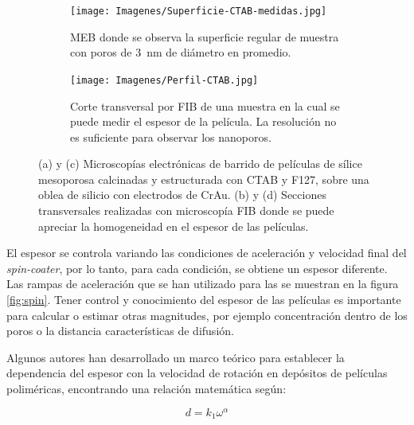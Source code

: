 \begin{figure}[bh!]
\begin{subfigure}[t]{0.495\textwidth}
			       		\label{fig:sem_homogeneidad2}
			       		\end{subfigure}	
			       	\begin{subfigure}[t]{0.495\textwidth}
			        	\texttt{[image: Imagenes/Superficie-CTAB-medidas.jpg]}
			       		\caption{MEB donde se observa la superficie regular de muestra \pdmC\space con poros de \SI{3}{nm} de diámetro en promedio.}
			       		\label{fig:sem_homogeneidad3}
			       		\end{subfigure}
					\begin{subfigure}[t]{0.49\textwidth}
			 	   	    \texttt{[image: Imagenes/Perfil-CTAB.jpg]}
			       		\caption{Corte transversal por FIB de una muestra \pdmC\space en la cual se puede medir el espesor de la película. La resolución no es suficiente para observar los nanoporos.}
			       		\label{fig:sem_homogeneidad4}
			       		\end{subfigure}	
					
					\vspace{-2mm}
					 \caption[MEB \pdmC\space y \pdmF.]{(a) y (c) Microscopías electrónicas de barrido de películas de sílice mesoporosa calcinadas y estructurada con CTAB y F127, sobre una oblea de silicio con electrodos de Cr\textbar Au. (b) y (d) Secciones transversales realizadas con microscopía FIB donde se puede apreciar la homogeneidad en el espesor de las películas.}
					 \label{fig:sem_homogeneidad}	
				     \vspace*{0.2cm}
				     \end{figure}
 	
		 El espesor se controla variando las condiciones de aceleración y velocidad final del \textit{spin-coater}, por lo tanto, para cada condición, se obtiene un espesor diferente. Las rampas de aceleración que se han utilizado para las \pdm\space se muestran en la figura \ref{fig:spin}. Tener control y conocimiento del espesor de las películas es importante para calcular o estimar otras magnitudes, por ejemplo concentración dentro de los poros o la distancia características de difusión. 

		 Algunos autores han desarrollado un marco teórico para establecer la dependencia del espesor con la velocidad de rotación en depósitos de películas poliméricas, encontrando una relación matemática según: \cite{Norrman2005,Meyerhofer1978,Bornside1989,Lora1990}
	
			\begin{equation}
			  d = k_1 \omega^{\alpha}
			  \label{eq:spin_meso}
			  \end{equation}		
	
